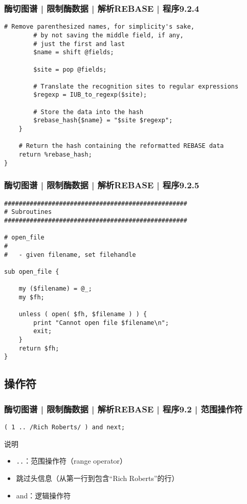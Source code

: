 \begin{frame}[fragile]
  \frametitle{酶切图谱 | 限制酶数据 | 解析REBASE | 程序9.2.4}
  \vspace{-1.8em}
\begin{lstlisting}[firstnumber=39,basicstyle=\footnotesize\tt,numberstyle=\scriptsize]
        # Remove parenthesized names, for simplicity's sake,
        # by not saving the middle field, if any,
        # just the first and last
        $name = shift @fields;

        $site = pop @fields;

        # Translate the recognition sites to regular expressions
        $regexp = IUB_to_regexp($site);

        # Store the data into the hash
        $rebase_hash{$name} = "$site $regexp";
    }

    # Return the hash containing the reformatted REBASE data
    return %rebase_hash;
}
\end{lstlisting}
\end{frame}

\begin{frame}[fragile]
  \frametitle{酶切图谱 | 限制酶数据 | 解析REBASE | 程序9.2.5}
  \vspace{-1.5em}
\begin{lstlisting}[firstnumber=57,basicstyle=\footnotesize\tt,numberstyle=\scriptsize]
##################################################
# Subroutines
##################################################

# open_file
#
#   - given filename, set filehandle

sub open_file {

    my ($filename) = @_;
    my $fh;

    unless ( open( $fh, $filename ) ) {
        print "Cannot open file $filename\n";
        exit;
    }
    return $fh;
}
\end{lstlisting}
\end{frame}

\subsection{操作符}
\begin{frame}[fragile]
  \frametitle{酶切图谱 | 限制酶数据 | 解析REBASE | 程序9.2 | \alert{范围操作符}}
  \vspace{-1.5em}
\begin{lstlisting}
( 1 .. /Rich Roberts/ ) and next;
\end{lstlisting}
\pause
\begin{block}{说明}
  \begin{itemize}
    \item \verb|..|：范围操作符（range operator）
    \item 跳过头信息（从第一行到包含“Rich Roberts”的行）
    \item and：逻辑操作符
  \end{itemize}
\end{block}
\end{frame}

